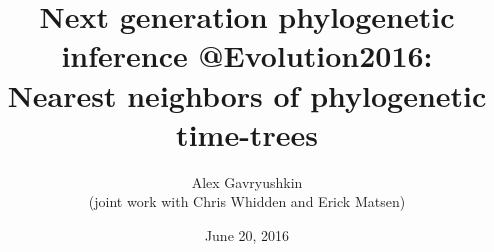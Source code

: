 \documentclass{beamer}
\title[\url{https://gavruskin.github.io/talks/2016_Evolution.pdf}]{Next generation phylogenetic inference @Evolution2016:\\
Nearest neighbors of phylogenetic time-trees}
\author[Alex Gavryushkin \hspace{80pt} These slides:]{Alex Gavryushkin\\
(joint work with Chris Whidden and Erick Matsen)}
\date{June 20, 2016}
\newcommand{\MCMC}{$\mathrm{MCMC}$ }
\theoremstyle{example}
\begin{document}
\begin{frame}[plain]
\titlepage
\end{frame}


\addtocounter{framenumber}{-1}


%
\end{document}
